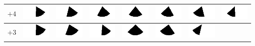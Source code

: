 \begin{tabular}{|c|c|c|c|c|c|c|c|}
	\hline 
	$+4$ &
	\includegraphics[width=0.045\linewidth]{img_Bereich/V1_vid_Winkel_X_-3000_4000.png}&
	\includegraphics[width=0.045\linewidth]{img_Bereich/V1_vid_Winkel_X_-2000_4000.png}&
	\includegraphics[width=0.045\linewidth]{img_Bereich/V1_vid_Winkel_X_-1000_4000.png}&
	\includegraphics[width=0.045\linewidth]{img_Bereich/V1_vid_Winkel_X_0_4000.png}&
	\includegraphics[width=0.045\linewidth]{img_Bereich/V1_vid_Winkel_X_1000_4000.png}&
	\includegraphics[width=0.045\linewidth]{img_Bereich/V1_vid_Winkel_X_2000_4000.png}&
	\includegraphics[width=0.045\linewidth]{img_Bereich/V1_vid_Winkel_X_3000_4000.png}\\ 
	\hline 
	$+3$ &
	\includegraphics[width=0.045\linewidth]{img_Bereich/V1_vid_Winkel_X_-3000_3000.png}&
	\includegraphics[width=0.045\linewidth]{img_Bereich/V1_vid_Winkel_X_-2000_3000.png}&
	\includegraphics[width=0.045\linewidth]{img_Bereich/V1_vid_Winkel_X_-1000_3000.png}&
	\includegraphics[width=0.045\linewidth]{img_Bereich/V1_vid_Winkel_X_0_3000.png}&
	\includegraphics[width=0.045\linewidth]{img_Bereich/V1_vid_Winkel_X_1000_3000.png}&
	\includegraphics[width=0.045\linewidth]{img_Bereich/V1_vid_Winkel_X_2000_3000.png}&

\end{tabular}
